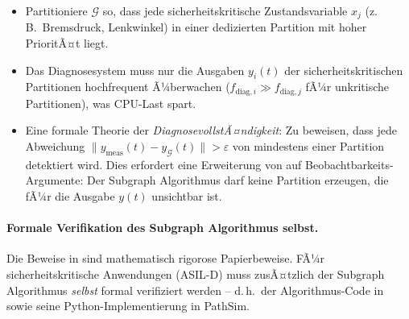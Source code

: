 ﻿\documentclass[12pt,a4paper]{article}
\theoremstyle{definition}
\begin{document}
\begin{itemize}[nosep]
  \item Partitioniere $\mathcal{G}$ so, dass jede sicherheitskritische
        Zustandsvariable $x_j$ (z.\,B.\ Bremsdruck, Lenkwinkel) in
        einer dedizierten Partition mit hoher PrioritÃ¤t liegt.

  \item Das Diagnosesystem muss nur die Ausgaben $y_i(t)$ der
        sicherheitskritischen Partitionen hochfrequent Ã¼berwachen
        ($f_{\mathrm{diag},i} \gg f_{\mathrm{diag},j}$ fÃ¼r unkritische
        Partitionen), was CPU-Last spart.

  \item Eine formale Theorie der \emph{DiagnosevollstÃ¤ndigkeit}: Zu beweisen,
        dass jede Abweichung $\|y_{\mathrm{meas}}(t) - y_{\mathcal{G}}(t)\|
        > \varepsilon$ von mindestens einer Partition detektiert wird.
        Dies erfordert eine Erweiterung von  auf
        Beobachtbarkeits-Argumente: Der Subgraph Algorithmus darf keine
        Partition erzeugen, die fÃ¼r die Ausgabe $y(t)$ unsichtbar ist.
\end{itemize}

\paragraph{Formale Verifikation des Subgraph Algorithmus selbst.}
Die Beweise in  sind mathematisch rigorose
Papierbeweise. FÃ¼r sicherheitskritische Anwendungen (ASIL-D)
muss zusÃ¤tzlich der Subgraph Algorithmus \emph{selbst}
formal verifiziert werden -- d.\,h.\ der Algorithmus-Code in
 sowie seine Python-Implementierung in PathSim.
\end{document}
